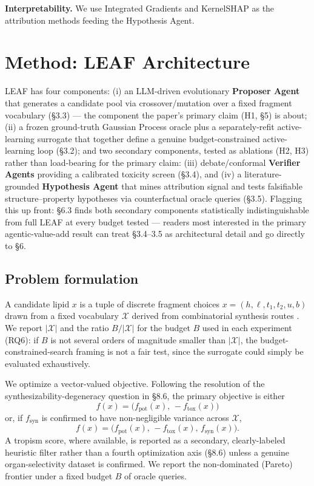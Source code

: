 \documentclass{article}
\begin{document}
\textbf{Interpretability.} We use Integrated Gradients
\citep{sundararajan2017} and KernelSHAP \citep{lundberg2017} as the
attribution methods feeding the Hypothesis Agent.

\section{Method: LEAF Architecture}

LEAF has four components: (i) an LLM-driven evolutionary \textbf{Proposer
Agent} that generates a candidate pool via crossover/mutation over a fixed
fragment vocabulary (\S3.3) --- the component the paper's primary claim
(H1, \S5) is about; (ii) a frozen ground-truth Gaussian Process oracle plus
a separately-refit active-learning surrogate that together define a
genuine budget-constrained active-learning loop (\S3.2); and two secondary
components, tested as ablations (H2, H3) rather than load-bearing for the
primary claim: (iii) debate/conformal \textbf{Verifier Agents} providing a
calibrated toxicity screen (\S3.4), and (iv) a literature-grounded
\textbf{Hypothesis Agent} that mines attribution signal and tests
falsifiable structure--property hypotheses via counterfactual oracle
queries (\S3.5). Flagging this up front: \S6.3 finds both secondary
components statistically indistinguishable from full LEAF at every budget
tested --- readers most interested in the primary agentic-value-add result
can treat \S3.4--3.5 as architectural detail and go directly to \S6.

\subsection{Problem formulation}

A candidate lipid $x$ is a tuple of discrete fragment choices $x = (h,
\ell, t_1, t_2, u, b)$ drawn from a fixed vocabulary $\mathcal{X}$ derived
from combinatorial synthesis routes \citep{xu2023ugi}. We report
$|\mathcal{X}|$ and the ratio $B/|\mathcal{X}|$ for the budget $B$ used in
each experiment (RQ6): if $B$ is not several orders of magnitude smaller
than $|\mathcal{X}|$, the budget-constrained-search framing is not a fair
test, since the surrogate could simply be evaluated exhaustively.

We optimize a vector-valued objective. Following the resolution of the
synthesizability-degeneracy question in \S8.6, the primary objective is
either
\[
f(x) = \big(f_{\text{pot}}(x),\, -f_{\text{tox}}(x)\big)
\]
or, if $f_{\text{syn}}$ is confirmed to have non-negligible variance across
$\mathcal{X}$,
\[
f(x) = \big(f_{\text{pot}}(x),\, -f_{\text{tox}}(x),\, f_{\text{syn}}(x)\big).
\]
A tropism score, where available, is reported as a secondary,
clearly-labeled heuristic filter rather than a fourth optimization axis
(\S8.6) unless a genuine organ-selectivity dataset is confirmed. We report
the non-dominated (Pareto) frontier under a fixed budget $B$ of oracle
queries.
\end{document}
